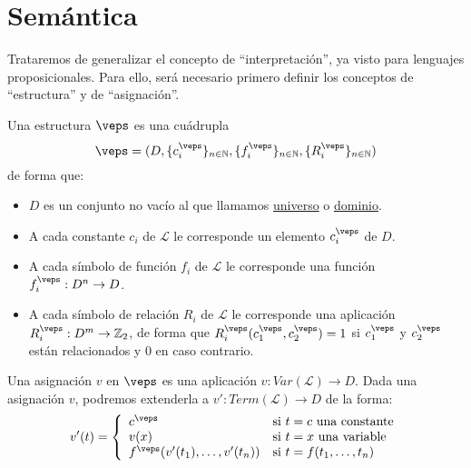 \section{Semántica}
Trataremos de generalizar el concepto de ``interpretación'', ya visto para lenguajes proposicionales. Para ello, será necesario primero definir los conceptos de ``estructura'' y de ``asignación''.

\begin{definicion}[Estructura]
    Una estructura $\veps$ es una cuádrupla
    \begin{equation*}
        \veps = (D, \{c_i^\veps\}_{n\in \mathbb{N}}, \{f_i^\veps\}_{n\in \mathbb{N}}, \{R_i^\veps\}_{n\in \mathbb{N}})
    \end{equation*}
    de forma que:
    \begin{itemize}
        \item $D$ es un conjunto no vacío al que llamamos \underline{universo} o \underline{dominio}.
        \item A cada constante $c_i$ de $\mathcal{L}$ le corresponde un elemento $c_i^{\veps}$ de $D$.
        \item A cada símbolo de función $f_i$ de $\mathcal{L}$ le corresponde una función $f_i^\veps:D^n\to D$.
        \item A cada símbolo de relación $R_i$ de $\mathcal{L}$ le corresponde una aplicación ${R_i^\veps:D^m\to\mathbb{Z}_2}$, de forma que $R_i^\veps(c_1^\veps,c_2^\veps)=1$ si $c_1^\veps$ y $c_2^\veps$ están relacionados y 0 en caso contrario.
    \end{itemize}
\end{definicion}

\begin{definicion}[Asignación]
    Una asignación $v$ en $\veps$ es una aplicación ${v:Var(\mathcal{L})\to D}$. Dada una asignación $v$, podremos extenderla a $v':Term(\mathcal{L})\to D$ de la forma:
    \begin{equation*}
        v'(t) = \left\{\begin{array}{ll}
                c^\veps & \text{si\ } t=c \text{\ una constante} \\
                v(x) & \text{si\ } t=x \text{\ una variable} \\
                f^\veps(v'(t_1),\ldots,v'(t_n)) &\text{si\ } t=f(t_1,\ldots,t_n)
        \end{array}\right.
    \end{equation*}
\end{definicion}

